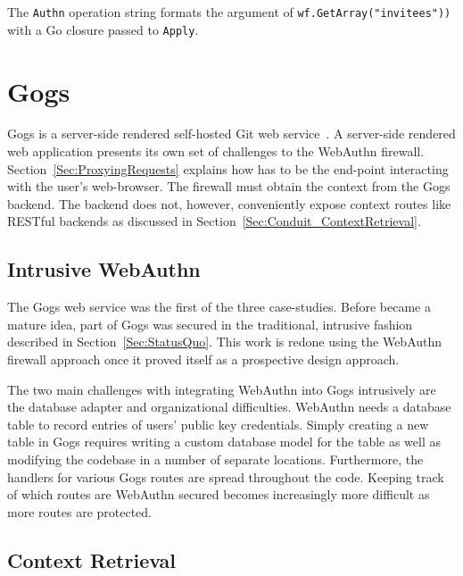The \lstinline{Authn} operation string formats the argument of \lstinline{wf.GetArray("invitees"))} with a Go closure passed to \lstinline{Apply}.

\section{Gogs}

Gogs is a server-side rendered self-hosted Git web service~\cite{gogs}. A server-side rendered web application presents its own set of challenges to the WebAuthn firewall. Section~\ref{Sec:ProxyingRequests} explains how \sys{} has to be the end-point interacting with the user's web-browser. The firewall must obtain the context from the Gogs backend. The backend does not, however, conveniently expose context routes like RESTful backends as discussed in Section~\ref{Sec:Conduit_ContextRetrieval}.


\subsection{Intrusive WebAuthn}

The Gogs web service was the first of the three case-studies. Before \sys{} became a mature idea, part of Gogs was secured in the traditional, intrusive fashion described in Section~\ref{Sec:StatusQuo}. This work is redone using the WebAuthn firewall approach once it proved itself as a prospective design approach.

The two main challenges with integrating WebAuthn into Gogs intrusively are the database adapter and organizational difficulties. WebAuthn needs a database table to record entries of users' public key credentials. Simply creating a new table in Gogs requires writing a custom database model for the table as well as modifying the codebase in a number of separate locations. Furthermore, the handlers for various Gogs routes are spread throughout the code. Keeping track of which routes are WebAuthn secured becomes increasingly more difficult as more routes are protected.


\subsection{Context Retrieval}

